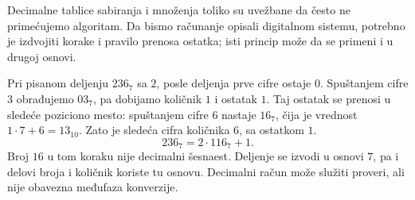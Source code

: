 
Decimalne tablice sabiranja i množenja toliko su uvežbane da često ne primećujemo algoritam. Da bismo računanje opisali digitalnom sistemu, potrebno je izdvojiti korake i pravilo prenosa ostatka; isti princip može da se primeni i u drugoj osnovi.

Pri pisanom deljenju $236_7$ sa $2$, posle deljenja prve cifre ostaje $0$. Spuštanjem cifre $3$ obrađujemo $03_7$, pa dobijamo količnik $1$ i ostatak $1$. Taj ostatak se prenosi u sledeće poziciono mesto: spuštanjem cifre $6$ nastaje $16_7$, čija je vrednost $1\cdot7+6=13_{10}$. Zato je sledeća cifra količnika $6$, sa ostatkom $1$.
\[236_7=2\cdot116_7+1.\]
Broj $16$ u tom koraku nije decimalni šesnaest. Deljenje se izvodi u osnovi $7$, pa i delovi broja i količnik koriste tu osnovu. Decimalni račun može služiti proveri, ali nije obavezna međufaza konverzije.
